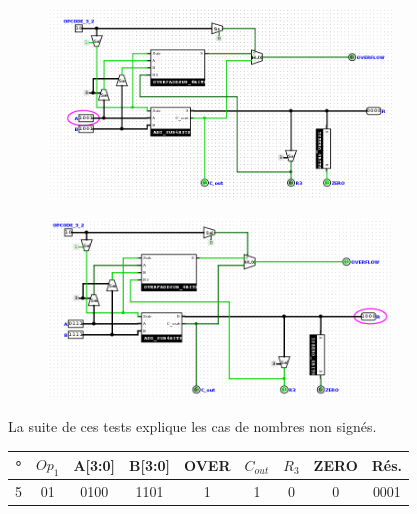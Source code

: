 \documentclass[a4paper]{article}
\begin{document}
\begin{tcolorbox}[colframe=Monokaimagenta,colback=white]

\begin{figure}[H]
    \centering
    
    \begin{subfigure}{.7\textwidth}
        \centering
        \includegraphics[width=.8\linewidth]{src/ADDSUB_TEST_AmoB.png}
        \label{fig:COMPARATEUR_EXEMPLE}
   \end{subfigure}
   
   \begin{subfigure}{.7\textwidth}
        \centering
        \includegraphics[width=.8\linewidth]{src/ADDSUB_TEST_AmoB1.png}
        \label{fig:COMPARATEUR_EXEMPLE_1}
   \end{subfigure}


La suite de ces tests explique les cas de nombres non signés.\\
\begin{tabular}{|c|c|c|c||c|c|c|c|c|}
    \hline
     ° & $Op_1$ & A[3:0] & B[3:0] & OVER & $C_{out}$ & $R_3$ & ZERO & Rés. \\
    \hline
    5  & 01     & 0100   & 1101   & 1    &  1        &   0   &  0   & 0001\\
    \hline
    
\end{tabular}


\end{figure}
\end{tcolorbox}
\end{document}
